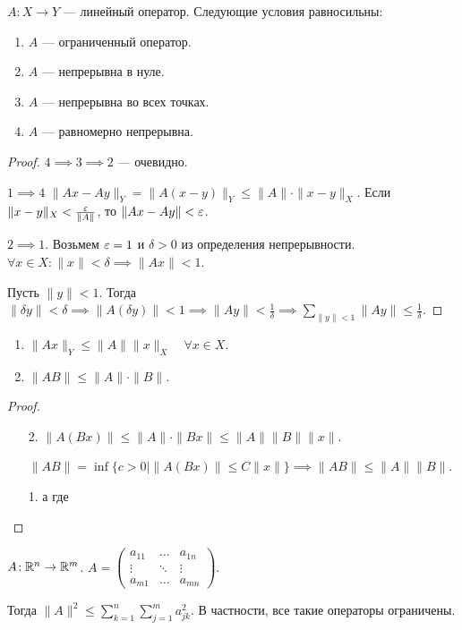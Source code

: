 \begin{theorem}
   $A\!: X \to Y$ --- линейный оператор. Следующие условия равносильны:
   \begin{enumerate}
       \item $A$ --- ограниченный оператор.
       \item  $A$ --- непрерывна в нуле.
       \item  $A$ --- непрерывна во всех точках.
       \item $A$ --- равномерно непрерывна.
   \end{enumerate}
\end{theorem}
\begin{proof}
    $4 \implies 3 \implies 2$ --- очевидно.

    $1 \implies 4$  $\|Ax - Ay\|_Y = \|A(x-y)\|_Y \le \|A\| \cdot \|x-y\|_X$. Если $\|x-y\|_X < \frac{\varepsilon}{\|A\|}$, то $\|Ax - Ay\| < \varepsilon$.

    $2 \implies 1$. Возьмем  $\varepsilon = 1$ и  $\delta > 0$ из определения непрерывности.  $\forall x \in X\!: \|x \| < \delta \implies \|Ax\| < 1$.

    Пусть $\|y\| < 1$. Тогда  $\|\delta y\| < \delta \implies \|A(\delta y)\| < 1 \implies \|Ay\| < \frac{1}{\delta} \implies \sum\limits_{\| y \| < 1} \| Ay\| \le \frac{1}{\delta}$.
\end{proof}
\begin{consequence}
    \begin{enumerate}
        \item $\|Ax\|_Y \le \| A \| \|x\|_X \quad \forall x\in X$.
        \item $\| A B \| \le \|A \| \cdot \|B\|$.
    \end{enumerate}
\end{consequence}
\begin{proof}
    \begin{enumerate}
        \item[2.] $\|A(Bx)\| \le \|A\| \cdot \|Bx\| \le \| A \| \|B\| \|x \|$.

        $\|AB\| = \inf \{c > 0 \mid \|A(Bx)\| \le C\|x\|\} \implies \| AB\| \le \|A\|\|B\|$.

    \item[1.] а где
    \end{enumerate}
\end{proof}
\begin{theorem}
    $A\!: \mathbb{R}^n \to \mathbb{R}^m$.  $A = \begin{pmatrix} a_{11} & \ldots & a_{1n} \\ \vdots & \ddots & \vdots \\ a_{m1} & \ldots & a_{mn} \end{pmatrix}$.

    Тогда $\|A\|^2 \le \sum\limits_{k=1}^n \sum\limits_{j=1}^m a_{jk}^2$. В частности, все такие операторы ограничены.
\end{theorem}
